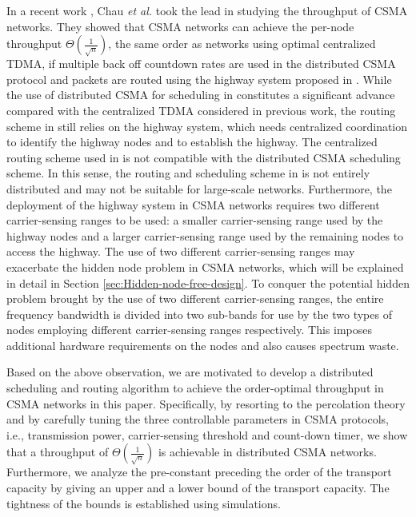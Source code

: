 \documentclass[english]{IEEEtran}
\theoremstyle{plain}
\theoremstyle{plain}
\theoremstyle{plain}
\theoremstyle{remark}
\begin{document}
In a recent work \cite{Chau11Capacity}, Chau \emph{et al.} took the
lead in studying the throughput of CSMA networks. They showed that
CSMA networks can achieve the per-node throughput $\Theta\left(\frac{1}{\sqrt{n}}\right)$,
the same order as networks using optimal centralized TDMA, if multiple
back off countdown rates are used in the distributed CSMA protocol
and packets are routed using the highway system proposed in \cite{Franceschetti07Closing}.
While the use of distributed CSMA for scheduling in \cite{Chau11Capacity}
constitutes a significant advance compared with the centralized TDMA
considered in previous work, the routing scheme in \cite{Chau11Capacity}
still relies on the highway system, which needs centralized coordination
to identify the highway nodes and to establish the highway. The centralized
routing scheme used in \cite{Chau11Capacity} is not compatible with
the distributed CSMA scheduling scheme. In this sense, the routing
and scheduling scheme in \cite{Chau11Capacity} is not entirely distributed
and may not be suitable for large-scale networks. Furthermore, the
deployment of the highway system in CSMA networks requires two different
carrier-sensing ranges to be used: a smaller carrier-sensing range
used by the highway nodes and a larger carrier-sensing range used
by the remaining nodes to access the highway. The use of two different
carrier-sensing ranges may exacerbate the hidden node problem in CSMA
networks, which will be explained in detail in Section \ref{sec:Hidden-node-free-design}.
To conquer the potential hidden problem brought by the use of two
different carrier-sensing ranges, the entire frequency bandwidth is
divided into two sub-bands for use by the two types of nodes employing
different carrier-sensing ranges respectively. This imposes additional
hardware requirements on the nodes and also causes spectrum waste.

Based on the above observation, we are motivated to develop a distributed
scheduling and routing algorithm to achieve the order-optimal throughput
in CSMA networks in this paper. Specifically, by resorting to the
percolation theory and by carefully tuning the three controllable
parameters in CSMA protocols, i.e., transmission power, carrier-sensing
threshold and count-down timer, we show that a throughput of $\Theta\left(\frac{1}{\sqrt{n}}\right)$
is achievable in distributed CSMA networks. Furthermore, we analyze
the pre-constant preceding the order of the transport capacity by
giving an upper and a lower bound of the transport capacity. The tightness
of the bounds is established using simulations.
\end{document}
